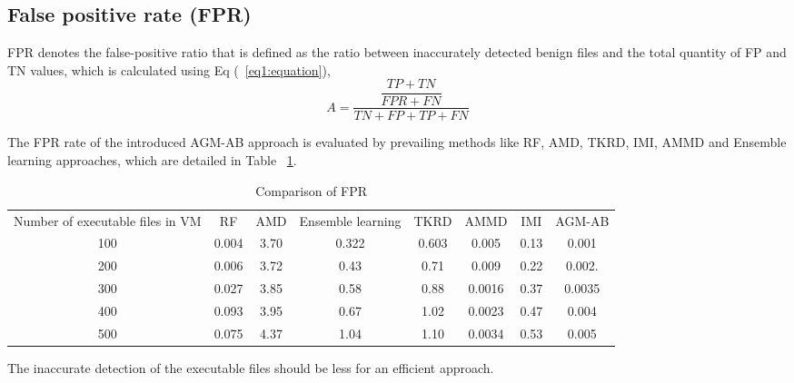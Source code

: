 \documentclass{gji}
\begin{document}
\subsection{False positive rate (FPR)}
\par FPR denotes the false-positive ratio that is defined as the ratio between inaccurately detected benign files and the total quantity of FP and TN values, which is calculated using Eq (~\ref{eq1:equation}),
\begin{equation}
A = \dfrac{\dfrac{TP+TN}{FPR+FN}}{TN+FP+TP+FN}
\label{eq1:equation}
\end{equation}
\par The FPR rate of the introduced AGM-AB approach is evaluated by prevailing methods like RF, AMD, TKRD, IMI, AMMD and Ensemble learning approaches, which are detailed in Table ~\ref{tab:freq2}.
\begin{table}
  \caption{Comparison of FPR}
  \label{tab:freq2}
  \begin{tabular}{cccccccc}
    Number of executable files in VM&RF&AMD&Ensemble learning&TKRD&AMMD&IMI&AGM-AB\\
       100& 0.004	&3.70	&0.322&	0.603&	0.005&	0.13&	0.001\\
       200&	0.006&	3.72	&0.43	&0.71&0.009	&0.22&	0.002.\\
        300&	0.027&	3.85&	0.58	&0.88	&0.0016&	0.37	&0.0035\\
       400&	0.093&	3.95&	0.67&	1.02&	0.0023&	0.47&	0.004\\
       500&	0.075&	4.37&	1.04&	1.10&	0.0034&	0.53&	0.005\\
\end{tabular}
\end{table}
The inaccurate detection of the executable files should be less for an efficient approach.
\end{document}
